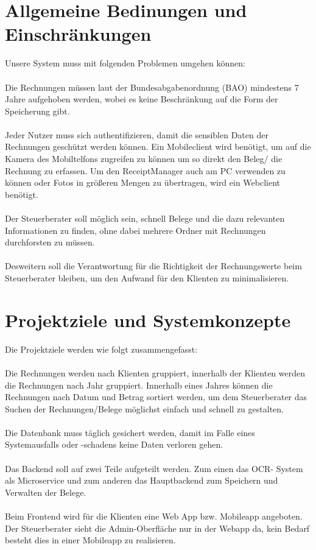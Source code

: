 \documentclass[12pt]{article}
\theoremstyle{definition}
\begin{document}
\section{Allgemeine Bedinungen und Einschränkungen}
Unsere System muss mit folgenden Problemen umgehen können: \\ \\
Die Rechnungen müssen laut der Bundesabgabenordnung (BAO) mindestens 7 Jahre aufgehoben werden, wobei es keine Beschränkung auf die Form der Speicherung gibt.\\ \\
Jeder Nutzer muss sich authentifizieren, damit die sensiblen Daten der Rechnungen geschützt werden können.
Ein Mobileclient wird benötigt, um auf die Kamera des Mobiltelfons zugreifen zu können um so direkt den Beleg/ die Rechnung zu erfassen. Um den ReceiptManager auch am PC verwenden zu können oder Fotos in größeren Mengen zu übertragen, wird ein Webclient benötigt.\\ \\
Der Steuerberater soll möglich sein, schnell Belege und die dazu relevanten Informationen zu finden, ohne dabei mehrere Ordner mit Rechnungen durchforsten zu müssen.\\ \\
Desweitern soll die Verantwortung für die Richtigkeit der Rechnungswerte beim Steuerberater bleiben, um den Aufwand für den Klienten zu minimalisieren.\\

\pagebreak

\section{Projektziele und Systemkonzepte}
Die Projektziele werden wie folgt zusammengefasst: \\ \\
Die Rechnungen werden nach Klienten gruppiert, innerhalb der Klienten werden die Rechnungen nach Jahr gruppiert. Innerhalb eines Jahres können die Rechnungen nach Datum und Betrag sortiert werden, um dem Steuerberater das Suchen der Rechnungen/Belege möglichst einfach und schnell zu gestalten.\\ \\
Die Datenbank muss täglich gesichert werden, damit im Falle eines Systemausfalls oder -schadens keine Daten verloren gehen.\\ \\
Das Backend soll auf zwei Teile aufgeteilt werden. Zum einen das OCR- System als Microservice und zum anderen das Hauptbackend zum Speichern und Verwalten der Belege.\\ \\
Beim Frontend wird für die Klienten eine Web App bzw. Mobileapp angeboten. Der Steuerberater sieht die Admin-Oberfläche nur in der Webapp da, kein Bedarf besteht dies in einer Mobileapp zu realisieren.\\
\end{document}
